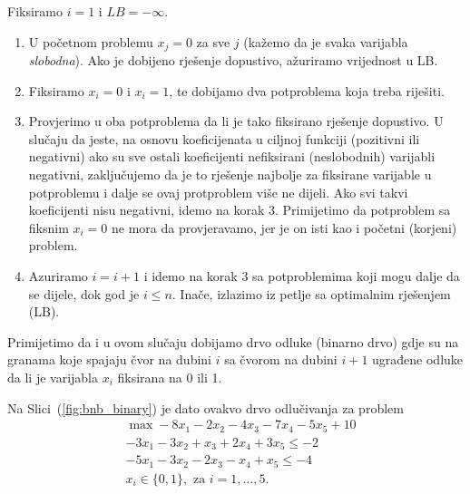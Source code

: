 \documentclass[a4paper, utf8, 11pt, colorlinks]{article}
\begin{document}
Fiksiramo $i=1$ i $LB=-\infty$. 

\begin{enumerate}
    \item U početnom problemu  $x_j=0$ za sve $j$ (kažemo da je svaka varijabla \emph{slobodna}). Ako je dobijeno rješenje dopustivo, ažuriramo vrijednost u LB.
    \item Fiksiramo $x_i=0$  i $x_i=1$, te dobijamo dva potproblema koja treba riješiti.
    \item  Provjerimo u oba potproblema da li je tako fiksirano rješenje dopustivo. U slučaju da jeste, na osnovu koeficijenata u ciljnoj funkciji (pozitivni ili negativni) ako su sve ostali koeficijenti nefiksirani (neslobodnih) varijabli negativni, zaključujemo da je to rješenje najbolje za fiksirane varijable u potproblemu i dalje se ovaj protproblem više ne dijeli. Ako svi takvi koeficijenti nisu negativni, idemo na korak 3. Primijetimo da   potproblem sa fiksnim $x_i=0$ ne mora da provjeravamo, jer je on isti kao i početni (korjeni) problem.
    \item Azuriramo $i = i+1$ i idemo na korak 3 sa potproblemima koji mogu dalje da se dijele, dok god je $i \leq n$. Inače, izlazimo iz petlje sa optimalnim rješenjem (LB). 
\end{enumerate}
 Primijetimo da i u ovom slučaju dobijamo drvo odluke (binarno drvo) gdje su na granama koje spajaju čvor na dubini $i$ sa čvorom na dubini $i+1$  ugrađene odluke da li je varijabla $x_i$ fiksirana na 0 ili 1.

Na Slici~(\ref{fig:bnb_binary}) je dato ovakvo drvo odlučivanja za problem 
\begin{align}
   &\max -8 x_1 - 2x_2 - 4x_3 - 7x_4 -5x_5 + 10 \\
   & -3 x_1 - 3 x_2 + x_3 + 2 x_4 + 3 x_5 \leq -2 \\
   & -5 x_1 - 3 x_2 - 2 x_3 - x_4 + x_5 \leq -4 \\
   & x_i \in \{0, 1\}, \mbox{ za } i=1,\ldots,5.
\end{align}

\end{document}
